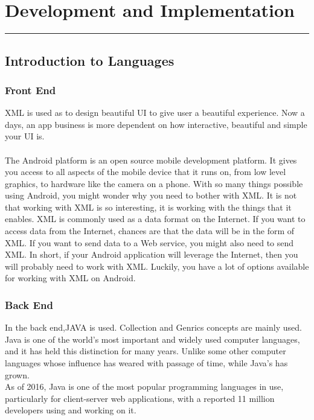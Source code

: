 \chapter{Development and Implementation}\hrule
\label{Chapter:4}
\section{Introduction to Languages}
\subsection{Front End}
XML is used as to design beautiful UI to give user a beautiful experience. Now a days, an app business is more dependent on how interactive, beautiful and simple your UI is.\\
\\
The Android platform is an open source mobile development platform. It gives you access to all aspects of the mobile device that it runs on, from low level graphics, to hardware like the camera on a phone. With so many things possible using Android, you might wonder why you need to bother with XML. It is not that working with XML is so interesting, it is working with the things that it enables. XML is commonly used as a data format on the Internet. If you want to access data from the Internet, chances are that the data will be in the form of XML. If you want to send data to a Web service, you might also need to send XML. In short, if your Android application will leverage the Internet, then you will probably need to work with XML. Luckily, you have a lot of options available for working with XML on Android.
\subsection{Back End}
In the back end,JAVA is used. Collection and Genrics concepts are mainly used. Java is one of the world's most important and widely used computer languages, and it has held this distinction for many years. Unlike some other computer languages whose influence has weared with passage of time, while Java's has grown.\\

As of 2016, Java is one of the most popular programming languages in use, particularly for client-server web applications, with a reported 11 million developers using and working on it.\\

